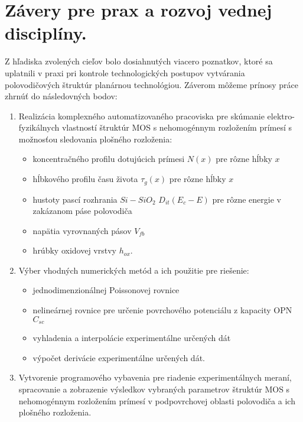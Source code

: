 \chapter{Závery pre prax a rozvoj vednej disciplíny.}\label{Chapter9}

Z hľadiska zvolených cieľov bolo dosiahnutých viacero poznatkov, ktoré
sa uplatnili v praxi pri kontrole technologických postupov vytvárania
polovodičových štruktúr planárnou technológiou. Záverom môžeme prínosy
práce zhrnúť do následovných bodov:

\begin{enumerate}

\item Realizácia komplexného automatizovaného pracoviska pre skúmanie
  elektro-fyzikálnych vlastností štruktúr MOS s nehomogénnym
  rozložením prímesí s možnosťou sledovania plošného rozloženia:

  \begin{itemize}
  \item koncentračného profilu dotujúcich prímesi $N(x)$ pre rôzne
    hĺbky $x$
  \item hĺbkového profilu času života $\tau_{g}(x)$ pre rôzne hĺbky
    $x$
  \item hustoty pascí rozhrania $Si-SiO_{2}$ $D_{it}(E_{c}-E)$ pre
    rôzne energie v zakázanom páse polovodiča
  \item napätia vyrovnaných pásov $V_{fb}$
  \item hrúbky oxidovej vrstvy $h_{ox}$.
  \end{itemize}

\item Výber vhodných numerických metód a ich použitie pre riešenie:

  \begin{itemize}
  \item jednodimenzionálnej Poissonovej rovnice
  \item nelineárnej rovnice pre určenie povrchového potenciálu z
    kapacity OPN $C_{sc}$
  \item vyhladenia a interpolácie experimentálne určených dát
  \item výpočet derivácie experimentálne určených dát.
  \end{itemize}

\item Vytvorenie programového vybavenia pre riadenie experimentálnych
  meraní, spracovanie a zobrazenie výsledkov vybraných parametrov
  štruktúr MOS s nehomogénnym rozložením prímesí v podpovrchovej
  oblasti polovodiča a ich plošného rozloženia.


\end{enumerate}
